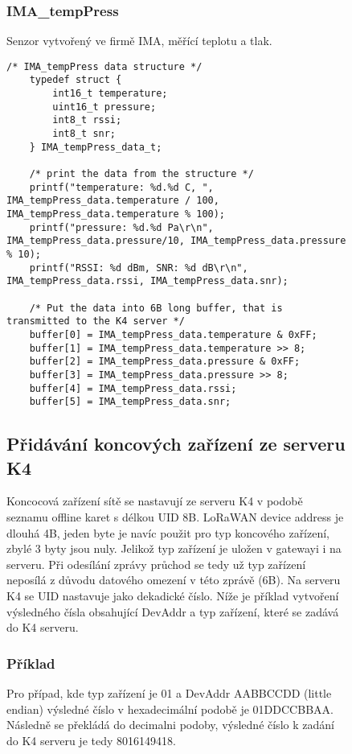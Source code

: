 \begin{figure}[!h]
\subsubsection{IMA\_tempPress}
Senzor vytvořený ve firmě IMA, měřící teplotu a tlak.

\begin{lstlisting}[style=CStyle]
    /* IMA_tempPress data structure */   
    typedef struct {
        int16_t temperature;
        uint16_t pressure;
        int8_t rssi;
        int8_t snr;
    } IMA_tempPress_data_t;
    
    /* print the data from the structure */
	printf("temperature: %d.%d C, ", IMA_tempPress_data.temperature / 100, IMA_tempPress_data.temperature % 100);
	printf("pressure: %d.%d Pa\r\n", IMA_tempPress_data.pressure/10, IMA_tempPress_data.pressure % 10);
	printf("RSSI: %d dBm, SNR: %d dB\r\n", IMA_tempPress_data.rssi, IMA_tempPress_data.snr);

    /* Put the data into 6B long buffer, that is transmitted to the K4 server */
	buffer[0] = IMA_tempPress_data.temperature & 0xFF;
	buffer[1] = IMA_tempPress_data.temperature >> 8;
	buffer[2] = IMA_tempPress_data.pressure & 0xFF;
	buffer[3] = IMA_tempPress_data.pressure >> 8;
	buffer[4] = IMA_tempPress_data.rssi;
	buffer[5] = IMA_tempPress_data.snr;
\end{lstlisting}


\subsection{Přidávání koncových zařízení ze serveru K4}
Koncocová zařízení sítě se nastavují ze serveru K4 v podobě seznamu offline karet s délkou UID 8B.
LoRaWAN device address je dlouhá 4B, jeden byte je navíc použit pro typ koncového zařízení, zbylé 3 byty jsou nuly.
Jelikož typ zařízení je uložen v gatewayi i na serveru. Při odesílání zprávy průchod se tedy už typ zařízení neposílá z důvodu datového omezení v této zprávě (6B).
Na serveru K4 se UID nastavuje jako dekadické číslo.
Níže je příklad vytvoření výsledného čísla obsahující DevAddr a typ zařízení, které se zadává do K4 serveru.

\subsubsection{Příklad}
Pro případ, kde typ zařízení je 01 a DevAddr AABBCCDD (little endian) výsledné číslo v hexadecimální podobě je 01DDCCBBAA. Následně se překládá do decimalni podoby, výsledné číslo k zadání do K4 serveru je tedy 8016149418.



\end{figure}
